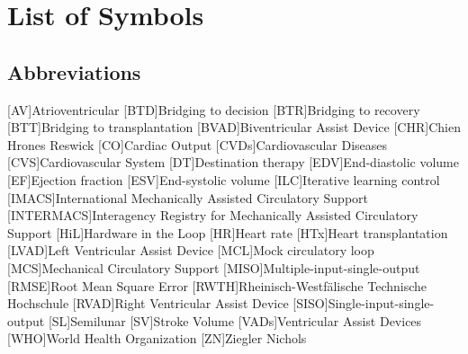 \chapter*{List of Symbols}										%



\section*{Abbreviations}
%
[AV]{Atrioventricular}
[BTD]{Bridging to decision}
[BTR]{Bridging to recovery}
[BTT]{Bridging to transplantation}
[BVAD]{Biventricular Assist Device}
[CHR]{Chien Hrones Reswick}
[CO]{Cardiac Output}
[CVDs]{Cardiovascular Diseases}
[CVS]{Cardiovascular System}
[DT]{Destination therapy}
[EDV]{End-diastolic volume}
[EF]{Ejection fraction}
[ESV]{End-systolic volume}
[ILC]{Iterative learning control}
[IMACS]{International Mechanically Assisted Circulatory Support}
[INTERMACS]{Interagency Registry for Mechanically Assisted Circulatory Support}
[HiL]{Hardware in the Loop}
[HR]{Heart rate}
[HTx]{Heart transplantation}
[LVAD]{Left Ventricular Assist Device}
[MCL]{Mock circulatory loop}
[MCS]{Mechanical Circulatory Support}
[MISO]{Multiple-input-single-output}
[RMSE]{Root Mean Square Error}
[RWTH]{Rheinisch-Westf{\"a}lische Technische Hochschule}
[RVAD]{Right Ventricular Assist Device}
[SISO]{Single-input-single-output}
[SL]{Semilunar}
[SV]{Stroke Volume}
[VADs]{Ventricular Assist Devices}
[WHO]{World Health Organization}
[ZN]{Ziegler Nichols}


